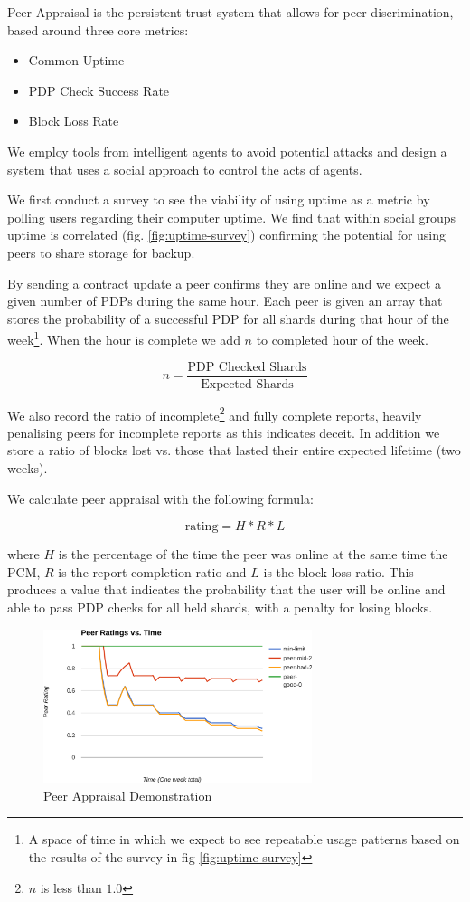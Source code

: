 \documentclass[11pt, a4paper, twoside]{report}
\begin{document}
Peer Appraisal is the persistent trust system that allows for peer discrimination, based around three core metrics:

\begin{itemize}
 \item Common Uptime
 \item PDP Check Success Rate
 \item Block Loss Rate
\end{itemize}

We employ tools from intelligent agents to avoid potential attacks and design a system that uses a social approach \citep{pinyol2013computational} to control the acts of agents.

We first conduct a survey to see the viability of using uptime as a metric by polling users regarding their computer uptime. We find that within social groups uptime is correlated (fig. \ref{fig:uptime-survey}) confirming the potential for using peers to share storage for backup.

By sending a contract update a peer confirms they are online and we expect a given number of PDPs during the same hour. Each peer is given an array that stores the probability of a successful PDP for all shards during that hour of the week\footnote{A space of time in which we expect to see repeatable usage patterns based on the results of the survey in fig \ref{fig:uptime-survey}}. When the hour is complete we add $n$ to completed hour of the week.

$$n = \frac{\mbox{PDP Checked Shards}}{\mbox{Expected Shards}}$$

We also record the ratio of incomplete\footnote{$n$ is less than $1.0$} and fully complete reports, heavily penalising peers for incomplete reports as this indicates deceit. In addition we store a ratio of blocks lost vs. those that lasted their entire expected lifetime (two weeks).

We calculate peer appraisal with the following formula:

$$\mbox{rating} = H * R * L$$

where $H$ is the percentage of the time the peer was online at the same time the PCM, $R$ is the report completion ratio and $L$ is the block loss ratio. This produces a value that indicates the probability that the user will be online and able to pass PDP checks for all held shards, with a penalty for losing blocks.

\begin{figure}[h]
 \centering
 \includegraphics[width=0.7\textwidth]{peer-appraisal}
 \caption{Peer Appraisal Demonstration}
 \label{fig:peer-appraisal}
\end{figure}
\end{document}
